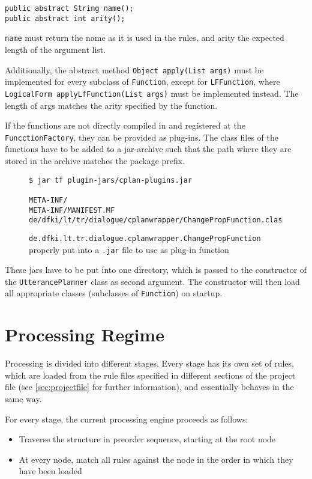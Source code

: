 \documentclass[11pt,a4paper]{article}
\begin{document}
{\begin{verbatim}
public abstract String name();
public abstract int arity();
\end{verbatim}

\texttt{name} must return the name as it is used in the rules, and arity the
expected length of the argument list.

Additionally, the abstract method \verb|Object apply(List args)| must be
implemented for every subclass of \texttt{Function}, except for
\texttt{LFFunction}, where \verb|LogicalForm applyLfFunction(List args)|
must be implemented instead. The length of args matches the arity specified by
the function.

If the functions are not directly compiled in and registered at the
\texttt{FuncctionFactory}, they can be provided as plug-ins. The class files
of the functions have to be added to a jar-archive such that the path where
they are stored in the archive matches the package prefix.

\begin{figure}[htbp]
\begin{verbatim}
$ jar tf plugin-jars/cplan-plugins.jar

META-INF/
META-INF/MANIFEST.MF
de/dfki/lt/tr/dialogue/cplanwrapper/ChangePropFunction.class
\end{verbatim}
\caption{\texttt{de.dfki.lt.tr.dialogue.cplanwrapper.ChangePropFunction}
  properly put into a \texttt{.jar} file to use as plug-in function }
\end{figure}

These jars have to be put into one directory, which is passed to the
constructor of the \texttt{UtterancePlanner} class as second argument. The
constructor will then load all appropriate classes (subclasses of
\texttt{Function}) on startup.


\section{Processing Regime\label{sec:procregime}}

Processing is divided into different stages. Every stage has its own set of
rules, which are loaded from the rule files specified in different sections of
the project file (see \ref{sec:projectfile} for further information), and
essentially behaves in the same way.

For every stage, the current processing engine proceeds as follows:
\begin{itemize}
\item Traverse the structure in preorder sequence, starting at the root node
\item At every node, match all rules against the node in the order in which
  they have been loaded


\end{itemize}}
\end{document}
